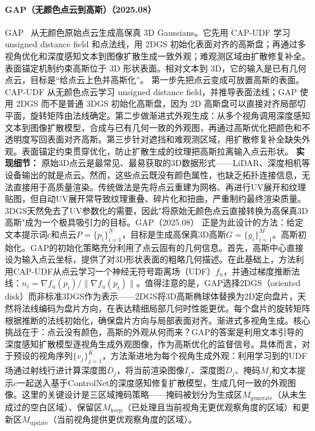 \paragraph{GAP（无颜色点云到高斯）（2025.08）}
GAP~\cite{2508_05631} 从无颜色原始点云生成高保真 3D Gaussians。它先用 CAP-UDF 学习 unsigned distance field 和点法线，用 2DGS 初始化表面对齐的高斯盘；再通过多视角优化和深度感知文本到图像扩散生成一致外观；难观测区域由扩散修复补全。表面锚定机制约束高斯位于 3D 形状表面。相对文本到 3D，它的输入是已有几何点云，目标是“给点云上色并高斯化”。
第一步先把点云变成可放置高斯的表面。CAP-UDF 从无颜色点云学习 unsigned distance field，并推导表面法线；GAP 使用 2DGS 而不是普通 3DGS 初始化高斯盘，因为 2D 高斯盘可以直接对齐局部切平面，旋转矩阵由法线确定。第二步做渐进式外观生成：从多个视角调用深度感知文本到图像扩散模型，合成与已有几何一致的外观图，再通过高斯优化把颜色和不透明度写回表面对齐高斯。第三步针对遮挡和难观测区域，用扩散修复补全缺失外观。表面锚定约束贯穿优化，防止扩散生成的纹理把高斯拉离输入点云形状。
\textbf{实现细节：} 原始3D点云是最常见、最易获取的3D数据形式——LiDAR、深度相机等设备输出的就是点云。然而，这些点云既没有颜色属性，也缺乏拓扑连接信息，无法直接用于高质量渲染。传统做法是先将点云重建为网格、再进行UV展开和纹理贴图，但自动UV展开常导致纹理重叠、碎片化和扭曲，严重制约最终渲染质量。3DGS天然免去了UV参数化的需要，因此"将原始无颜色点云直接转换为高保真3D高斯"成为一个极具吸引力的目标。GAP（2025.08） 正是为此设计的方法：给定文本提示词$c$和点云$P = \{p_i\}_{i=1}^N$，目标是生成高保真3D高斯$G = \{g_i\}_{i=1}^M$。高斯初始化。GAP的初始化策略充分利用了点云固有的几何信息。首先，高斯中心直接设为输入点云坐标，提供了对3D形状表面的粗略几何描述。在此基础上，方法利用CAP-UDF从点云学习一个神经无符号距离场（UDF）$f_u$，并通过梯度推断法线：$n_i = \nabla f_u(p_i) / \|\nabla f_u(p_i)\|$。值得注意的是，GAP选择2DGS（oriented disk）而非标准3DGS作为表示——2DGS将3D高斯椭球体替换为2D定向盘片，天然将法线编码为盘片方向，在表达精细局部几何时性能更优。每个盘片的旋转矩阵根据推断的法线初始化，确保盘片方向与局部表面对齐。渐进式多视角生成。核心挑战在于：点云没有颜色，高斯的外观从何而来？GAP的答案是利用文本引导的深度感知扩散模型逐视角生成外观图像，作为高斯优化的监督信号。具体而言，对于预设的视角序列$\{v_j\}_{j=1}^K$，方法渐进地为每个视角生成外观：利用学习到的UDF场通过射线行进计算深度图$D_j$，将当前渲染图像$I_j$、深度图$D_j$、掩码$M_j$和文本提示$c$一起送入基于ControlNet的深度感知修复扩散模型，生成几何一致的外观图像。这里的关键设计是三区域掩码策略——掩码被划分为生成区$M_{\mathrm{generate}}$（从未生成过的空白区域）、保留区$M_{\mathrm{keep}}$（已处理且当前视角无更优观察角度的区域）和更新区$M_{\mathrm{update}}$（当前视角提供更优观察角度的区域）。
